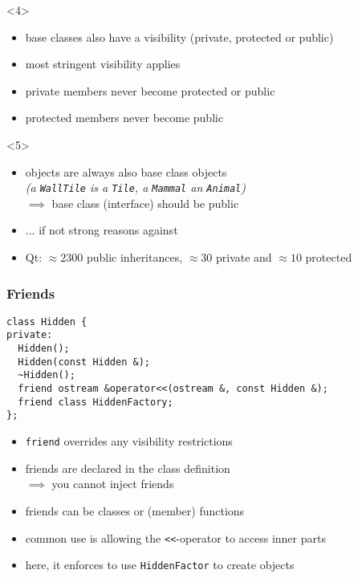 \documentclass{slides}
\begin{document}
\begin{frame}[fragile]
  \begin{onlyenv}<4>
    \begin{itemize}
    \item base classes also have a visibility (private, protected or public)
    \item most stringent visibility applies
    \item private members never become protected or public
    \item protected members never become public
    \end{itemize}
  \end{onlyenv}

  \begin{onlyenv}<5>
    \begin{itemize}
    \item objects are always also base class objects\\
      \emph{(a \lstinline!WallTile! is a \lstinline!Tile!, a
      \lstinline!Mammal! an \lstinline!Animal!)}\\
      $\implies$ \alert{base class (interface) should be public}
    \item ... if not strong reasons against
    \item Qt: $\approx 2300$ public inheritances, $\approx 30$ private
      and $\approx 10$ protected
    \end{itemize}
  \end{onlyenv}
\end{frame}

\begin{frame}[fragile]
  \frametitle{Friends}

\begin{lstlisting}[emph={friend}]
class Hidden {
private:
  Hidden();
  Hidden(const Hidden &);
  ~Hidden();
  friend ostream &operator<<(ostream &, const Hidden &);
  friend class HiddenFactory;
};
\end{lstlisting}
  \begin{itemize}
  \item \lstinline!friend! overrides any visibility restrictions
  \item friends are declared in the class definition\\
    $\implies$ you cannot inject friends
  \item friends can be classes or (member) functions
  \item common use is allowing the \lstinline!<<!-operator to access inner parts
  \item here, it enforces to use \lstinline!HiddenFactor! to create objects
  \end{itemize}
\end{frame}
\end{document}
